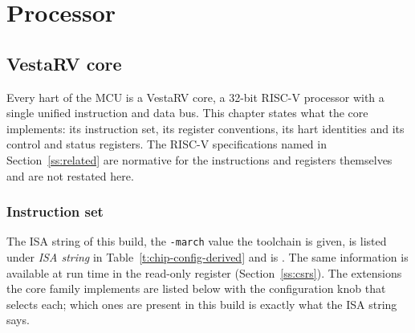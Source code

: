 \documentclass[11pt,pdftex,openany,letterpaper]{report}
\begin{document}

\clearpage



\part{Processor}

\chapter{VestaRV core} \label{s:cpu-instructions}

Every hart of the \AsicNameForUserGuide{} MCU is a VestaRV core, a 32-bit RISC-V processor with a single unified instruction and data bus. This chapter states what the core implements: its instruction set, its register conventions, its hart identities and its control and status registers. The RISC-V specifications named in Section~\ref{ss:related} are normative for the instructions and registers themselves and are not restated here.

\section{Instruction set} \label{ss:isa}

The ISA string of this build, the \texttt{-march} value the toolchain is given, is listed under \emph{ISA string} in Table~\ref{t:chip-config-derived}\ifdefined\IsaString{} and is \texttt{\IsaString}\fi. The same information is available at run time in the read-only  register (Section~\ref{ss:csrs}). The extensions the core family implements are listed below with the configuration knob that selects each; which ones are present in this build is exactly what the ISA string says.
\end{document}

